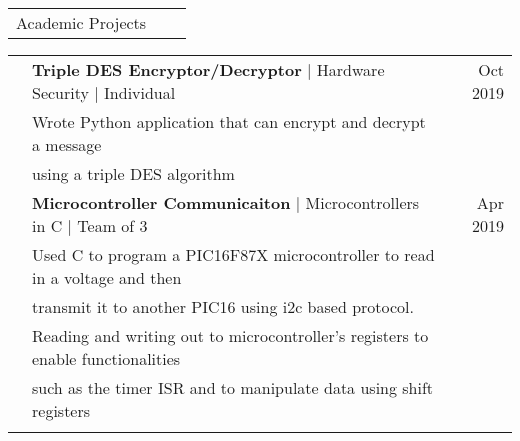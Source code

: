 \documentclass[letterpaper,10pt,oneside]{article}
\begin{document}
 \noindent \begin{tabularx}{\linewidth}{@{} l l R } 
     \Large{Academic Projects}\\
 \end{tabularx}
 \noindent \begin{tabularx}{\linewidth}{@{} l l R } 
     & \textbf{Triple DES Encryptor/Decryptor} $\mid$ Hardware Security $\mid$ Individual & Oct 2019 \\
     &Wrote Python application that can encrypt and decrypt a message\\
     &\indent using a triple DES algorithm\\
     & \textbf{Microcontroller Communicaiton} $\mid$ Microcontrollers in C $\mid$ Team of 3 & Apr 2019 \\
     &  Used C to program a PIC16F87X microcontroller to read in a voltage and then \\
     &\indent transmit it to another PIC16 using i2c based protocol.\\
     & Reading and writing out to microcontroller's registers to enable functionalities \\
     &\indent such as the timer ISR and to manipulate data using shift registers\\
     \\
\end{tabularx}
\end{document}
